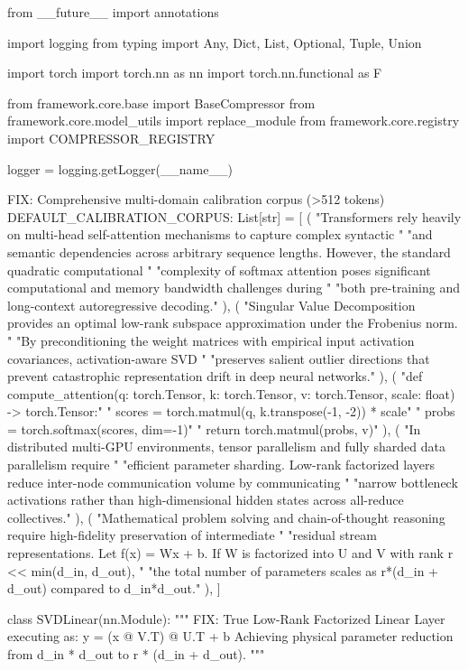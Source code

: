 from \_\_future\_\_ import annotations

import logging
from typing import Any, Dict, List, Optional, Tuple, Union

import torch
import torch.nn as nn
import torch.nn.functional as F

from framework.core.base import BaseCompressor
from framework.core.model\_utils import replace\_module
from framework.core.registry import COMPRESSOR\_REGISTRY

logger = logging.getLogger(\_\_name\_\_)

 FIX: Comprehensive multi-domain calibration corpus (>512 tokens)
DEFAULT\_CALIBRATION\_CORPUS: List[str] = [
    (
        "Transformers rely heavily on multi-head self-attention mechanisms to capture complex syntactic "
        "and semantic dependencies across arbitrary sequence lengths. However, the standard quadratic computational "
        "complexity of softmax attention poses significant computational and memory bandwidth challenges during "
        "both pre-training and long-context autoregressive decoding."
    ),
    (
        "Singular Value Decomposition provides an optimal low-rank subspace approximation under the Frobenius norm. "
        "By preconditioning the weight matrices with empirical input activation covariances, activation-aware SVD "
        "preserves salient outlier directions that prevent catastrophic representation drift in deep neural networks."
    ),
    (
        "def compute\_attention(q: torch.Tensor, k: torch.Tensor, v: torch.Tensor, scale: float) -> torch.Tensor:\n"
        "    scores = torch.matmul(q, k.transpose(-1, -2)) * scale\n"
        "    probs = torch.softmax(scores, dim=-1)\n"
        "    return torch.matmul(probs, v)\n"
    ),
    (
        "In distributed multi-GPU environments, tensor parallelism and fully sharded data parallelism require "
        "efficient parameter sharding. Low-rank factorized layers reduce inter-node communication volume by communicating "
        "narrow bottleneck activations rather than high-dimensional hidden states across all-reduce collectives."
    ),
    (
        "Mathematical problem solving and chain-of-thought reasoning require high-fidelity preservation of intermediate "
        "residual stream representations. Let f(x) = Wx + b. If W is factorized into U and V with rank r << min(d\_in, d\_out), "
        "the total number of parameters scales as r*(d\_in + d\_out) compared to d\_in*d\_out."
    ),
]


class SVDLinear(nn.Module):
    """
    FIX: True Low-Rank Factorized Linear Layer executing as:
    y = (x @ V.T) @ U.T + b
    Achieving physical parameter reduction from d\_in * d\_out to r * (d\_in + d\_out).
    """

